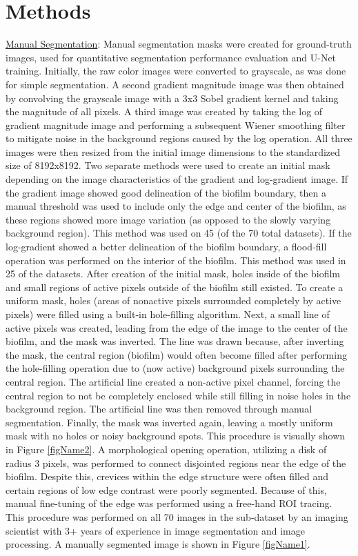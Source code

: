 \documentclass[conference]{IEEEtran}
\begin{document}
\section{Methods}
\ul{Manual Segmentation}: Manual segmentation masks were created for ground-truth images, used for quantitative segmentation performance evaluation and U-Net training. Initially, the raw color images were converted to grayscale, as was done for simple segmentation. A second gradient magnitude image was then obtained by convolving the grayscale image with a 3x3 Sobel gradient kernel and taking the magnitude of all pixels. A third image was created by taking the log of gradient magnitude image and performing a subsequent Wiener smoothing filter to mitigate noise in the background regions caused by the log operation. All three images were then resized from the initial image dimensions to the standardized size of 8192x8192. Two separate methods were used to create an initial mask depending on the image characteristics of the gradient and log-gradient image. If the gradient image showed good delineation of the biofilm boundary, then a manual threshold was used to include only the edge and center of the biofilm, as these regions showed more image variation (as opposed to the slowly varying background region). This method was used on 45 (of the 70 total datasets). If the log-gradient showed a better delineation of the biofilm boundary, a flood-fill operation was performed on the interior of the biofilm. This method was used in 25 of the datasets. After creation of the initial mask, holes inside of the biofilm and small regions of active pixels outside of the biofilm still existed. To create a uniform mask, holes (areas of nonactive pixels surrounded completely by active pixels) were filled using a built-in hole-filling algorithm. Next, a small line of active pixels was created, leading from the edge of the image to the center of the biofilm, and the mask was inverted. The line was drawn because, after inverting the mask, the central region (biofilm) would often become filled after performing the hole-filling operation due to (now active) background pixels surrounding the central region. The artificial line created a non-active pixel channel, forcing the central region to not be completely enclosed while still filling in noise holes in the background region. The artificial line was then removed through manual segmentation. Finally, the mask was inverted again, leaving a mostly uniform mask with no holes or noisy background spots. This procedure is visually shown in Figure \ref{figName2}. A morphological opening operation, utilizing a disk of radius 3 pixels, was performed to connect disjointed regions near the edge of the biofilm. Despite this, crevices within the edge structure were often filled and certain regions of low edge contrast were poorly segmented. Because of this, manual fine-tuning of the edge was performed using a free-hand ROI tracing. This procedure was performed on all 70 images in the sub-dataset by an imaging scientist with 3+ years of experience in image segmentation and image processing. A manually segmented image is shown in Figure \ref{figName1}.
\end{document}
